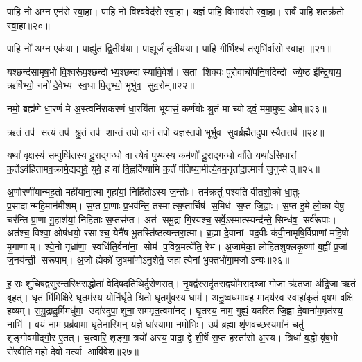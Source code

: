 पाहि नो अग्न एन॑से स्वा॒हा। पाहि नो विश्ववेद॑से स्वा॒हा। यज्ञं पाहि विभाव॑सो स्वा॒हा। सर्वं पाहि शतक्र॑तो स्वा॒हा॥२०॥
\anuvakamend

पा॒हि नो॑ अग्न॒ एक॑या। पा॒ह्यु॑त द्वि॒तीय॑या। पा॒ह्यूर्जं॑ तृ॒तीय॑या। पा॒हि गी॒र्भिश्च॑ त॒सृभि॑र्वासो॒ स्वाहा॥२१॥
\anuvakamend


यश्छन्द॑सामृष॒भो वि॒श्वरू॑प॒श्छन्दोभ्य॒श्छन्दास्यावि॒वेश॑। सता शिक्यः पुरोवाचो॑पनि॒षदिन्द्रो ज्ये॒ष्ठ इ॑न्द्रि॒याय॒ ऋषि॑भ्यो॒ नमो॑ दे॒वेभ्य॑ स्व॒धा पि॒तृभ्यो॒ भूर्भुव॒ सुव॒रोम्॥२२॥
\anuvakamend


नमो॒ ब्रह्म॑णे धा॒रणं॑ मे अ॒स्त्वनि॑राकरणं धा॒रयि॑ता भूयासं॒ कर्ण॑योः श्रु॒तं मा च्योढ्वं॒ ममा॒मुष्य॒ ओम्॥२३॥
\anuvakamend

ऋ॒तं तप॑ स॒त्यं तप॑ श्रु॒तं तप॑ शा॒न्तं तपो॒ दानं॒ तपो॒ यज्ञ॒स्तपो॒ भूर्भुव॒ सुव॒र्ब्रह्मै॒तदुपास्यै॒तत्तप॑॥२४॥
\anuvakamend


यथा॑ वृ॒क्षस्य॑ स॒म्पुष्पि॑तस्य दू॒राद्ग॒न्धो वात्ये॒वं पुण्य॑स्य क॒र्मणो॑ दू॒राद्ग॒न्धो वा॑ति॒ यथा॑ऽसिधा॒रां क॒र्तेऽव॑हितामव॒क्रामे॒द्यद्युवे॒ युवे॒ ह वा॑ वि॒ह्वदि॑ष्यामि क॒र्तं प॑तिष्या॒मीत्ये॒वम॒नृता॑दा॒त्मानं॑ जु॒गुप्सेत्॥२५॥
\anuvakamend


अ॒णोरणी॑यान्मह॒तो मही॑याना॒त्मा गुहा॑यां॒ निहि॑तोऽस्य ज॒न्तोः। तम॑क्रतुं पश्यति वीतशो॒को धा॒तुः प्र॒सादान्महि॒मान॑\-मीशम्। स॒प्त प्रा॒णाः प्र॒भव॑न्ति॒ तस्मात्स॒प्तार्चिष॑ स॒मिध॑ स॒प्त जि॒ह्वाः। स॒प्त इ॒मे लो॒का येषु॒ चर॑न्ति प्रा॒णा गु॒हाश॑यां॒ निहि॑ताः स॒प्तस॑प्त। अत॑ समु॒द्रा गि॒रय॑श्च॒ सर्वे॒ऽस्मात्स्यन्द॑न्ते॒ सिन्ध॑व॒ सर्व॑रूपाः। अत॑श्च॒ विश्वा॒ ओष॑धयो॒ रसाश्च॒ येनै॑ष भू॒तस्ति॑ष्ठत्यन्तरा॒त्मा। ब्र॒ह्मा दे॒वानां पद॒वीः क॑वी॒नामृषि॒र्विप्रा॑णां महि॒षो मृ॒गाणाम्। श्ये॒नो गृध्रा॑णा॒ स्वधि॑ति॒र्वना॑ना॒ सोम॑ प॒वित्र॒मत्ये॑ति॒ रेभ\sn{}। अ॒जामेकां॒ लोहि॑तशुक्लकृ॒ष्णां ब॒ह्वीं प्र॒जां ज॒नय॑न्ती॒ सरू॑पाम्। अ॒जो ह्येको॑ जु॒षमा॑णोऽनु॒शेते॒ जहात्येनां भु॒क्तभो॑गा॒मजोऽन्यः॥२६॥

ह॒सः शु॑चि॒षद्वसु॑रन्तरिक्ष॒सद्धोता॑ वेदि॒षदति॑थिर्दुरोण॒सत्। नृ॒षद्व॑र॒सदृ॑त॒सद्व्यो॑म॒सद॒ब्जा गो॒जा ऋ॑त॒जा अ॑द्रि॒जा ऋ॒तं बृ॒हत्। घृ॒तं मि॑मिक्षिरे घृ॒तम॑स्य॒ योनि॑र्घृ॒ते श्रि॒तो घृ॒तमु॑वस्य॒ धाम॑। अ॒नु॒ष्व॒धमाव॑ह मा॒दय॑स्व॒ स्वाहा॑कृतं॑ वृषभ वक्षि ह॒व्यम्। स॒मु॒द्रादू॒र्मिमधु॑मा॒ उदा॑रदुपा॒शुना॒ सम॑मृत॒त्वमा॑नट्। घृ॒तस्य॒ नाम॒ गुह्यं॒ यदस्ति॑ जि॒ह्वा दे॒वाना॑म॒मृत॑स्य॒ नाभि॑। व॒यं नाम॒ प्रब्र॑वामा घृ॒तेना॒स्मिन् य॒ज्ञे धा॑रयामा॒ नमो॑भिः। उप॑ ब्र॒ह्मा शृ॑णवच्छ॒स्यमा॑नं॒ चतु॑ शृङ्गोवमीद्गौ॒र ए॒तत्। च॒त्वारि॒ शृङ्गा॒ त्रयो॑ अस्य॒ पादा॒ द्वे शी॒र्\mbox{}षे स॒प्त हस्ता॑सो अ॒स्य। त्रिधा॑ ब॒द्धो वृ॑ष॒भो रो॑रवीति म॒हो दे॒वो मर्त्या॒ आवि॑वेश॥२७॥


